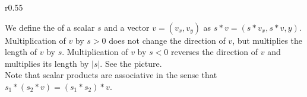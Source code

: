 \documentclass[12pt]{article}
\begin{document}
\bigskip

\begin{minipage}{\textwidth}\raggedright
\begin{wrapfigure}{r}{0.55\textwidth}
\end{wrapfigure}
We define the  of a scalar $s$ and a vector
$v=(v_x,v_y)$ as $s*v = (s*v_x,s*v,y)$.  Multiplication
of $v$ by $s>0$ does not change the direction of $v$,
but multiplies the length of $v$ by $s$.  Multiplication of $v$ by
$s<0$ reverses the direction of $v$ and multiplies its length
by $|s|$.  See the picture.
\\[1ex]
Note that scalar products are associative in the sense that
$s_1*(s_2*v)=(s_1*s_2)*v$.
\end{minipage}

\bigskip
\end{document}
